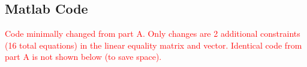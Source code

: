 \documentclass[../report/main.tex]{subfiles}
\begin{document}
\subsection*{ Matlab Code}
\textcolor{red}{Code minimally changed from part A.  Only changes are 2 additional constraints (16 total equations) in the linear equality matrix and vector.  Identical code from part A is not shown below (to save space).}

\end{document}
